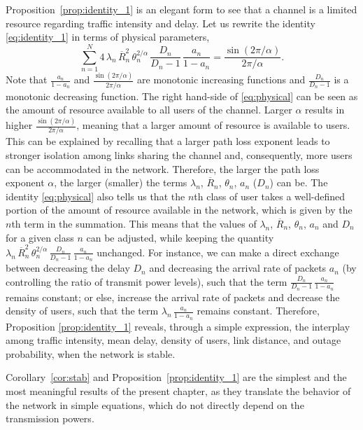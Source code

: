 Proposition~\ref{prop:identity_1} is an elegant form to see that a channel is a limited resource regarding traffic intensity and delay. Let us rewrite the identity \eqref{eq:identity_1} in terms of physical parameters,
\begin{equation} \label{eq:physical}
	\sum_{n=1}^N 4\,\lambda_n\,\overline{R}_n^2\,\theta_n^{2/\alpha}\,\dfrac{D_n}{D_n-1}\,\dfrac{a_n}{1-a_n} = \dfrac{\sin(2\pi/\alpha)}{2\pi/\alpha}.
\end{equation}
%
Note that $\frac{a_n}{1-a_n}$ and $\frac{\sin(2\pi/\alpha)}{2\pi/\alpha}$ are monotonic increasing functions and $\frac{D_n}{D_n-1}$ is a monotonic decreasing function. The right hand-side of \eqref{eq:physical} can be seen as the amount of resource available to all users of the channel.
%
Larger $\alpha$ results in higher   $\frac{\sin(2\pi/\alpha)}{2\pi/\alpha}$, meaning that a larger amount of resource is available to users. This can be explained by recalling that a larger path loss exponent leads to stronger isolation among links sharing the channel and, consequently, more users can be accommodated in the network.
%
Therefore, the larger the path loss exponent $\alpha$, the larger (smaller) the terms $\lambda_n$, $\overline{R}_n$, $\theta_n$, $a_n$ ($D_n$) can be. The identity \eqref{eq:physical} also tells us that the $n$th class of user takes a well-defined portion of the amount of resource available in the network, which is given by the $n$th term in the summation. 
%
This means that the values of $\lambda_n$, $\overline{R}_n$, $\theta_n$, $a_n$ and $D_n$ for a given class $n$ can be adjusted, while keeping the quantity $\lambda_n\,\overline{R}_n^2\,\theta_n^{2/\alpha}\,\frac{D_n}{D_n-1}\,\frac{a_n}{1-a_n}$ unchanged.
%
For instance, we can make a direct exchange between decreasing the delay $D_n$ and decreasing the arrival rate of packets $a_n$ (by controlling the ratio of transmit power levels), such that the term $\frac{D_n}{D_n-1}\,\frac{a_n}{1-a_n}$ remains constant; or else, increase the arrival rate of packets and decrease the density of users, such that the term $\lambda_n\,\frac{a_n}{1-a_n}$ remains constant. 
%
Therefore, Proposition \ref{prop:identity_1} reveals, through a simple expression, the interplay among traffic intensity, mean delay, density of users, link distance, and outage probability, when the network is stable.

\begin{remark}
    Corollary~\ref{cor:stab} and Proposition~\ref{prop:identity_1} are the simplest and the most meaningful results of the present chapter, as they translate the behavior of the network in simple equations, which do not directly depend on the transmission powers.
\end{remark}


